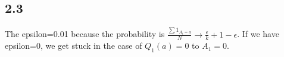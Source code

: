 \documentclass[answers]{exam}
\theoremstyle{definition}
\theoremstyle{remark}
\begin{document}
\subsection{2.3}
The epsilon=0.01 because the probability is $\frac{\sum 1_{A_{i}=a}}{N}\to \frac{\epsilon}{k}+1-\epsilon$. If we have epsilon=0, we get stuck in the case of $Q_1(a)=0$ to $A_{1}=0$.







\subsection{}
\end{document}
